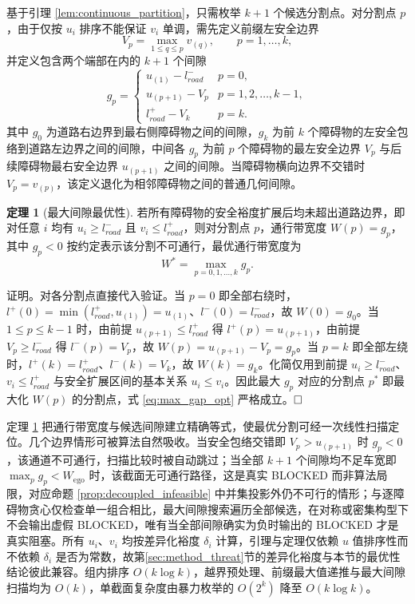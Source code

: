 \documentclass[a4paper,zihao=5]{ctexart}
\theoremstyle{definition}
\newtheorem{theorem}{定理}[section]
\begin{document}
基于引理 \ref{lem:continuous_partition}，只需枚举 $k+1$ 个候选分割点。对分割点 $p$，由于仅按 $u_i$ 排序不能保证 $v_i$ 单调，需先定义前缀左安全边界
\begin{equation}
    V_p = \max_{1 \leq q \leq p} v_{(q)}, \qquad p = 1, \ldots, k,
    \label{eq:prefix_v}
\end{equation}
并定义包含两个端部在内的 $k+1$ 个间隙
\begin{equation}
    g_p = \begin{cases}
        u_{(1)} - l_{road}^{-} & p = 0, \\[0.3em]
        u_{(p+1)} - V_p & p = 1, 2, \ldots, k-1, \\[0.3em]
        l_{road}^{+} - V_k & p = k.
    \end{cases}
    \label{eq:gap_def}
\end{equation}
其中 $g_0$ 为道路右边界到最右侧障碍物之间的间隙，$g_k$ 为前 $k$ 个障碍物的左安全包络到道路左边界之间的间隙，中间各 $g_p$ 为前 $p$ 个障碍物的最左安全边界 $V_p$ 与后续障碍物最右安全边界 $u_{(p+1)}$ 之间的间隙。当障碍物横向边界不交错时 $V_p = v_{(p)}$，该定义退化为相邻障碍物之间的普通几何间隙。

\begin{theorem}[最大间隙最优性]
\label{thm:max_gap}
若所有障碍物的安全裕度扩展后均未超出道路边界，即对任意 $i$ 均有 $u_i \geq l_{road}^{-}$ 且 $v_i \leq l_{road}^{+}$，则对分割点 $p$，通行带宽度 $W(p) = g_p$，其中 $g_p < 0$ 按约定表示该分割不可通行，最优通行带宽度为
\begin{equation}
    W^{*} = \max_{p = 0, 1, \ldots, k} g_p.
    \label{eq:max_gap_opt}
\end{equation}
\end{theorem}

证明。对各分割点直接代入验证。当 $p = 0$ 即全部右绕时，$l^{+}(0) = \min(l_{road}^{+}, u_{(1)}) = u_{(1)}$、$l^{-}(0) = l_{road}^{-}$，故 $W(0) = g_0$。当 $1 \leq p \leq k-1$ 时，由前提 $u_{(p+1)} \leq l_{road}^{+}$ 得 $l^{+}(p) = u_{(p+1)}$，由前提 $V_p \geq l_{road}^{-}$ 得 $l^{-}(p) = V_p$，故 $W(p) = u_{(p+1)} - V_p = g_p$。当 $p = k$ 即全部左绕时，$l^{+}(k) = l_{road}^{+}$、$l^{-}(k) = V_k$，故 $W(k) = g_k$。化简仅用到前提 $u_i \geq l_{road}^{-}$、$v_i \leq l_{road}^{+}$ 与安全扩展区间的基本关系 $u_i \leq v_i$。因此最大 $g_p$ 对应的分割点 $p^{*}$ 即最大化 $W(p)$ 的分割点，式 \eqref{eq:max_gap_opt} 严格成立。$\hfill\Box$

定理 \ref{thm:max_gap} 把通行带宽度与候选间隙建立精确等式，使最优分割可经一次线性扫描定位。几个边界情形可被算法自然吸收。当安全包络交错即 $V_p > u_{(p+1)}$ 时 $g_p < 0$，该通道不可通行，扫描比较时被自动跳过；当全部 $k+1$ 个间隙均不足车宽即 $\max_p g_p < W_{\text{ego}}$ 时，该截面无可通行路径，这是真实 BLOCKED 而非算法局限，对应命题 \ref{prop:decoupled_infeasible} 中并集投影外仍不可行的情形；与逐障碍物贪心仅检查单一组合相比，最大间隙搜索遍历全部候选，在对称或密集构型下不会输出虚假 BLOCKED，唯有当全部间隙确实为负时输出的 BLOCKED 才是真实阻塞。所有 $u_i$、$v_i$ 均按差异化裕度 $\delta_i$ 计算，引理与定理仅依赖 $u$ 值排序性而不依赖 $\delta_i$ 是否为常数，故第\ref{sec:method_threat}节的差异化裕度与本节的最优性结论彼此兼容。组内排序 $O(k\log k)$，越界预处理、前缀最大值递推与最大间隙扫描均为 $O(k)$，单截面复杂度由暴力枚举的 $O(2^k)$ 降至 $O(k\log k)$。
\end{document}
